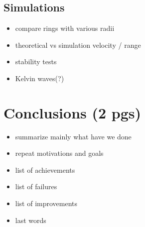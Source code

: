 \documentclass[a4paper, 12pt]{report}
\newcommand{\<}{\langle} %
\renewcommand{\>}{\rangle} %
\begin{document}
\section{Simulations}
\begin{itemize}
	\item compare rings with various radii
	\item theoretical vs simulation velocity / range
	\item stability tests
	\item Kelvin waves(?)
\end{itemize}

\newpage

\chapter{Conclusions (2 pgs)}

\begin{itemize}
	\item summarize mainly what have we done
	\item repeat motivations and goals
	\item list of achievements
	\item list of failures
	\item list of improvements
	\item last words
\end{itemize}

\newpage


\end{document}
